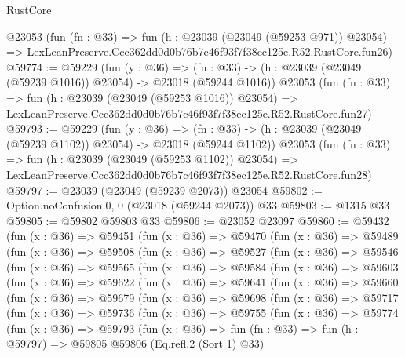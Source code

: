 \begin{lexlean}{RustCore}
\begin{coremodule}
    @23053
    (fun (fn : @33) =>
    fun (h : @23039 (@23049 (@59253 @971)) @23054) =>
    LexLeanPreserve.Ccc362dd0d0b76b7c46f93f7f38ec125e.R52.RustCore.fun26)
@59774 := @59229
    (fun (y : @36) =>
    (fn : @33) -> (h : @23039 (@23049 (@59239 @1016)) @23054) -> @23018 (@59244 @1016))
    @23053
    (fun (fn : @33) =>
    fun (h : @23039 (@23049 (@59253 @1016)) @23054) =>
    LexLeanPreserve.Ccc362dd0d0b76b7c46f93f7f38ec125e.R52.RustCore.fun27)
@59793 := @59229
    (fun (y : @36) =>
    (fn : @33) -> (h : @23039 (@23049 (@59239 @1102)) @23054) -> @23018 (@59244 @1102))
    @23053
    (fun (fn : @33) =>
    fun (h : @23039 (@23049 (@59253 @1102)) @23054) =>
    LexLeanPreserve.Ccc362dd0d0b76b7c46f93f7f38ec125e.R52.RustCore.fun28)
@59797 := @23039 (@23049 (@59239 @2073)) @23054
@59802 := Option.noConfusion.{0, 0} (@23018 (@59244 @2073)) @33
@59803 := @1315 @33
@59805 := @59802 @59803 @33
@59806 := @23052 @23097
@59860 := @59432
    (fun (x : @36) =>
    @59451
      (fun (x : @36) =>
      @59470
        (fun (x : @36) =>
        @59489
          (fun (x : @36) =>
          @59508
            (fun (x : @36) =>
            @59527
              (fun (x : @36) =>
              @59546
                (fun (x : @36) =>
                @59565
                  (fun (x : @36) =>
                  @59584
                    (fun (x : @36) =>
                    @59603
                      (fun (x : @36) =>
                      @59622
                        (fun (x : @36) =>
                        @59641
                          (fun (x : @36) =>
                          @59660
                            (fun (x : @36) =>
                            @59679
                              (fun (x : @36) =>
                              @59698
                                (fun (x : @36) =>
                                @59717
                                  (fun (x : @36) =>
                                  @59736
                                    (fun (x : @36) =>
                                    @59755
                                      (fun (x : @36) =>
                                      @59774
                                        (fun (x : @36) =>
                                        @59793
                                          (fun (x : @36) =>
                                          fun (fn : @33) =>
                                          fun (h : @59797) =>
                                          @59805
                                            @59806
                                            (Eq.refl.{2} (Sort 1) @33)

\end{coremodule}
\end{lexlean}
